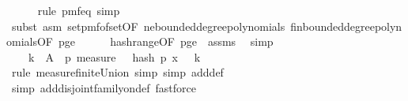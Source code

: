 \begin{isabellebody}
\ \ \ \ \isamarkupfalse%
\ {\isacharparenleft}{\kern0pt}rule\ pmf{\isacharunderscore}{\kern0pt}eq{\isacharcomma}{\kern0pt}\ simp{\isacharparenright}{\kern0pt}\isanewline
\ \ \ \ \isamarkupfalse%
\ {\isacharparenleft}{\kern0pt}subst\ {\isacharparenleft}{\kern0pt}asm{\isacharparenright}{\kern0pt}\ set{\isacharunderscore}{\kern0pt}pmf{\isacharunderscore}{\kern0pt}of{\isacharunderscore}{\kern0pt}set{\isacharbrackleft}{\kern0pt}OF\ ne{\isacharunderscore}{\kern0pt}bounded{\isacharunderscore}{\kern0pt}degree{\isacharunderscore}{\kern0pt}polynomials\ fin{\isacharunderscore}{\kern0pt}bounded{\isacharunderscore}{\kern0pt}degree{\isacharunderscore}{\kern0pt}polynomials{\isacharbrackleft}{\kern0pt}OF\ p{\isacharunderscore}{\kern0pt}ge{\isacharunderscore}{\kern0pt}{}{\isacharbrackright}{\kern0pt}{\isacharbrackright}{\kern0pt}{\isacharparenright}{\kern0pt}\isanewline
\ \ \ \ \isamarkupfalse%
\ hash{\isacharunderscore}{\kern0pt}range{\isacharbrackleft}{\kern0pt}OF\ p{\isacharunderscore}{\kern0pt}ge{\isacharunderscore}{\kern0pt}{}\ {\isacharunderscore}{\kern0pt}\ assms{\isacharparenleft}{\kern0pt}{}{\isacharparenright}{\kern0pt}{\isacharbrackright}{\kern0pt}\ \isamarkupfalse%
\ simp\isanewline
\ \ \isamarkupfalse%
\ \isamarkupfalse%
\ {\isachardoublequoteopen}{\isachardot}{\kern0pt}{\isachardot}{\kern0pt}{\isachardot}{\kern0pt}\ {\isacharequal}{\kern0pt}\ {\isacharparenleft}{\kern0pt}{\isasymSum}\ k\ {\isasymin}\ {\isacharparenleft}{\kern0pt}A\ {\isasyminter}\ {\isacharbraceleft}{\kern0pt}{}{\isachardot}{\kern0pt}{\isachardot}{\kern0pt}{\isacharless}{\kern0pt}p{\isacharbraceright}{\kern0pt}{\isacharparenright}{\kern0pt}{\isachardot}{\kern0pt}\ measure\ {\isasymOmega}\ {\isacharbraceleft}{\kern0pt}{\isasymomega}{\isachardot}{\kern0pt}\ hash\ p\ x\ {\isasymomega}\ {\isacharequal}{\kern0pt}\ k{\isacharbraceright}{\kern0pt}{\isacharparenright}{\kern0pt}{\isachardoublequoteclose}\isanewline
\ \ \ \ \isamarkupfalse%
\ {\isacharparenleft}{\kern0pt}rule\ measure{\isacharunderscore}{\kern0pt}finite{\isacharunderscore}{\kern0pt}Union{\isacharcomma}{\kern0pt}\ simp{\isacharcomma}{\kern0pt}\ simp\ add{\isacharcolon}{\kern0pt}{\isasymOmega}{\isacharunderscore}{\kern0pt}def{\isacharparenright}{\kern0pt}\isanewline
\ \ \ \ \ \isamarkupfalse%
\ {\isacharparenleft}{\kern0pt}simp\ add{\isacharcolon}{\kern0pt}disjoint{\isacharunderscore}{\kern0pt}family{\isacharunderscore}{\kern0pt}on{\isacharunderscore}{\kern0pt}def{\isacharcomma}{\kern0pt}\ fastforce{\isacharparenright}{\kern0pt}\ \isanewline

\end{isabellebody}

